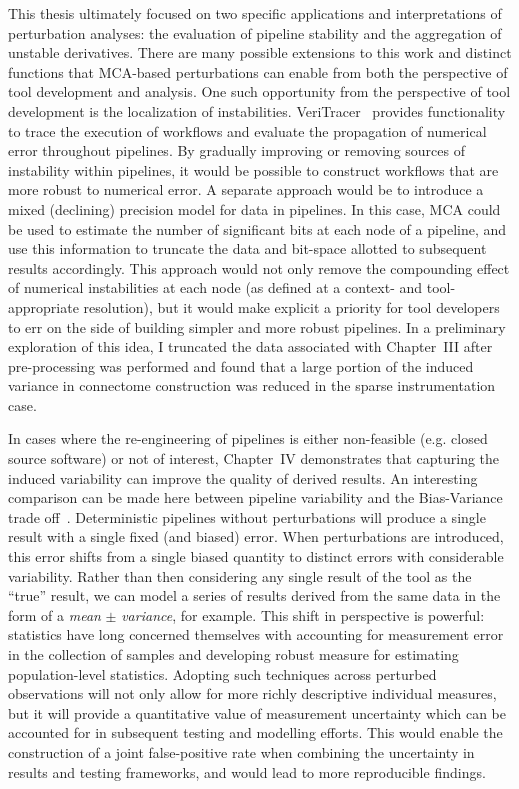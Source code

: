 This thesis ultimately focused on two specific applications and interpretations of perturbation analyses: the
evaluation of pipeline stability and the aggregation of unstable derivatives. There are many possible extensions to
this work and distinct functions that MCA-based perturbations can enable from both the perspective of tool
development and analysis. One such opportunity from the perspective of tool development is the localization of
instabilities. VeriTracer~\cite{chatelain2018veritracer} provides functionality to trace the execution of
workflows and evaluate the propagation of numerical error throughout pipelines. By gradually improving or
removing sources of instability within pipelines, it would be possible to construct workflows that are more
robust to numerical error. A separate approach would be to introduce a mixed (declining) precision model for
data in pipelines. In this case, MCA could be used to estimate the number of significant bits at each node of
a pipeline, and use this information to truncate the data and bit-space allotted to subsequent results accordingly.
This approach would not only remove the compounding effect of numerical instabilities at each node (as defined at a
context- and tool-appropriate resolution), but it would make explicit a priority for tool developers to err on
the side of building simpler and more robust pipelines. In a preliminary exploration of this idea, I truncated the
data associated with Chapter~III after pre-processing was performed and found that a large portion of the induced
variance in connectome construction was reduced in the sparse instrumentation case.

In cases where the re-engineering of pipelines is either non-feasible (e.g. closed source software) or not of
interest, Chapter~IV demonstrates that capturing the induced variability can improve the quality of derived results.
An interesting comparison can be made here between pipeline variability and the Bias-Variance trade
off~\cite{jain2000statistical}. Deterministic pipelines without perturbations will produce a single result with a
single fixed (and biased) error. When perturbations are introduced, this error shifts from a single biased quantity
to distinct errors with considerable variability. Rather than then considering any single result of the tool as the
``true'' result, we can model a series of results derived from the same data in the form of a \textit{mean} $\pm$
\textit{variance}, for example. This shift in perspective is powerful: statistics have long concerned themselves
with accounting for measurement error in the collection of samples and developing robust measure for estimating
population-level statistics. Adopting such techniques across perturbed observations will not only allow for more
richly descriptive individual measures, but it will provide a quantitative value of measurement uncertainty which
can be accounted for in subsequent testing and modelling efforts. This would enable the construction of a joint
false-positive rate when combining the uncertainty in results and testing frameworks, and would lead to more
reproducible findings.

